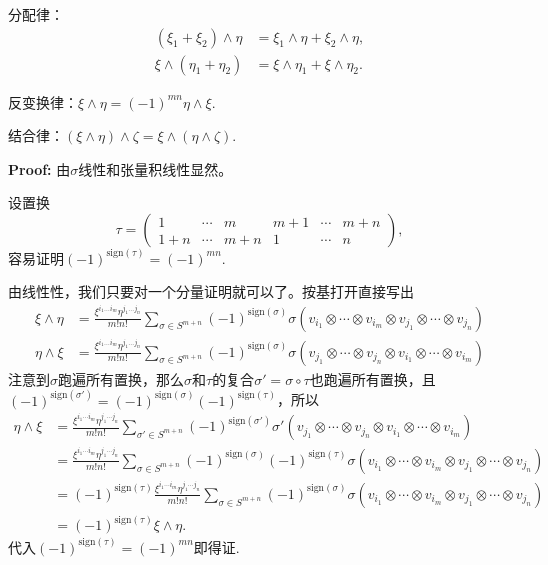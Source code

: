 \documentclass[9pt]{extbook}
\renewcommand{\proof}{\textbf{Proof:}\hspace{0.5em}}
\begin{document}
	分配律：
	\[
		\begin{split}
			(\xi_1+\xi_2)\wedge \eta&=\xi_1 \wedge \eta+\xi_2 \wedge \eta, \\
			\xi \wedge (\eta_1+\eta_2)&=\xi \wedge \eta_1+\xi \wedge \eta_2.
		\end{split}
	\]

	反变换律：$\xi \wedge \eta=(-1)^{mn}\eta \wedge \xi$.

	结合律：$(\xi \wedge \eta)\wedge \zeta=\xi \wedge (\eta\wedge \zeta)$.

\proof {} 由$\sigma$线性和张量积线性显然。

	 设置换
	\[
		\tau=
		\begin{pmatrix}
			1& \cdots & m & m+1 &\cdots &m+n\\
			1+n& \cdots & m+n & 1 &\cdots &n
		\end{pmatrix},
	\]
	容易证明$(-1)^{\mathrm{sign}(\tau)}=(-1)^{mn}$.

	由线性性，我们只要对一个分量证明就可以了。按基打开直接写出
	\[
		\begin{split}
			\xi \wedge \eta&=\frac{\xi^{i_1\dots i_m}\eta^{j_1 \dots j_n}}{m!n!}\sum_{\sigma\in S^{m+n}}(-1)^{\mathrm{sign}(\sigma)}\sigma(v_{i_1}\otimes \cdots \otimes v_{i_m}\otimes v_{j_1}\otimes \cdots \otimes v_{j_n})\\
			\eta \wedge \xi&=\frac{\xi^{i_1\dots i_m}\eta^{j_1 \dots j_n}}{m!n!}\sum_{\sigma\in S^{m+n}}(-1)^{\mathrm{sign}(\sigma)}\sigma(v_{j_1}\otimes \cdots \otimes v_{j_n}\otimes v_{i_1}\otimes \cdots \otimes v_{i_m})
		\end{split}
	\]
	注意到$\sigma$跑遍所有置换，那么$\sigma$和$\tau$的复合$\sigma'=\sigma\circ\tau$也跑遍所有置换，且$(-1)^{\mathrm{sign}(\sigma')}=(-1)^{\mathrm{sign}(\sigma)}(-1)^{\mathrm{sign}(\tau)}$，所以
	\[
		\begin{split}
			\eta \wedge \xi&=\frac{\xi^{i_1\cdots i_m}\eta^{j_1 \cdots j_n}}{m!n!}\sum_{\sigma'\in S^{m+n}}(-1)^{\mathrm{sign}(\sigma')}\sigma'(v_{j_1}\otimes \cdots \otimes v_{j_n}\otimes v_{i_1}\otimes \cdots \otimes v_{i_m})\\
			&=\frac{\xi^{i_1\cdots i_m}\eta^{j_1 \cdots j_n}}{m!n!}\sum_{\sigma\in S^{m+n}}(-1)^{\mathrm{sign}(\sigma)}(-1)^{\mathrm{sign}(\tau)}\sigma(v_{i_1}\otimes \cdots \otimes v_{i_m}\otimes v_{j_1}\otimes \cdots \otimes v_{j_n})\\
			&=(-1)^{\mathrm{sign}(\tau)}\frac{\xi^{i_1\cdots i_m}\eta^{j_1 \cdots j_n}}{m!n!}\sum_{\sigma\in S^{m+n}}(-1)^{\mathrm{sign}(\sigma)}\sigma(v_{i_1}\otimes \cdots \otimes v_{i_m}\otimes v_{j_1}\otimes \cdots \otimes v_{j_n})\\
			&=(-1)^{\mathrm{sign}(\tau)} \xi \wedge \eta.
		\end{split}
	\]
	代入$(-1)^{\mathrm{sign}(\tau)}=(-1)^{mn}$即得证.
\end{document}
